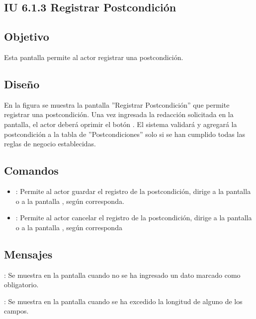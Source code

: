 \subsection{IU 6.1.3 Registrar Postcondición}

\subsection{Objetivo}
	Esta pantalla permite al actor registrar una postcondición.
\subsection{Diseño}
	En la figura  se muestra la pantalla ''Registrar Postcondición'' que permite registrar una postcondición. Una vez ingresada la redacción solicitada en la pantalla, el actor deberá oprimir el botón  . El sistema validará y agregará la postcondición a la tabla de ''Postcondiciones'' solo si se han cumplido todas las reglas de negocio establecidas.

\subsection{Comandos}
\begin{itemize}
	\item {}: Permite al actor guardar el registro de la postcondición, dirige a la pantalla  o a la pantalla , según corresponda.
	\item {}: Permite al actor cancelar el registro de la postcondición, dirige a la pantalla  o a la pantalla , según corresponda
\end{itemize}

\subsection{Mensajes}

\begin{Citemize}
	\item {}: Se muestra en la pantalla  cuando no se ha ingresado un dato marcado como obligatorio.
	\item {}: Se muestra en la pantalla  cuando se ha excedido la longitud de alguno de los campos.
\end{Citemize}
